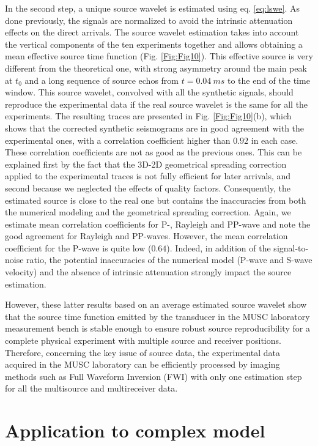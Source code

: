 \documentclass[extra,mreferee]{gji}
\begin{document}
In the second step, a unique source wavelet is estimated using eq. \ref{eq:lswe}. As done previously, the signals are normalized to avoid the intrinsic attenuation effects on the direct arrivals. The source wavelet estimation takes into account the vertical components of the ten experiments together and allows obtaining a mean effective source time function (Fig. \ref{Fig:Fig10}). This effective source is very different from the theoretical one, with strong asymmetry around the main peak at $t_{0}$ and a long sequence of source echos from $t=0.04\ ms$ to the end of the time window. This source wavelet, convolved with all the synthetic signals, should reproduce the experimental data if the real source wavelet is the same for all the experiments. The resulting traces are presented in Fig. \ref{Fig:Fig10}(b), which shows that the corrected synthetic seismograms are in good agreement with the experimental ones, with a correlation coefficient higher than $0.92$ in each case. These correlation coefficients are not as good as the previous ones. This can be explained first by the fact that the 3D-2D geometrical spreading correction applied to the experimental traces is not fully efficient for later arrivals, and second because we neglected the effects of quality factors. Consequently, the estimated source is close to the real one but contains the inaccuracies from both the numerical modeling and the geometrical spreading correction. Again, we estimate mean correlation coefficients for P-, Rayleigh and PP-wave and note the good agreement for Rayleigh and PP-waves. However, the mean correlation coefficient for the P-wave is quite low ($0.64$). Indeed, in addition of the signal-to-noise ratio, the potential inaccuracies of the numerical model (P-wave and S-wave velocity) and the absence of intrinsic attenuation strongly impact the source estimation.

However, these latter results based on an average estimated source wavelet show that the source time function emitted by the transducer in the MUSC laboratory measurement bench is stable enough to ensure robust source reproducibility for a complete physical experiment with multiple source and receiver positions. Therefore, concerning the key issue of source data, the experimental data acquired in the MUSC laboratory can be efficiently processed by imaging methods such as Full Waveform Inversion (FWI) with only one estimation step for all the multisource and multireceiver data.

\section{Application to complex model}
\end{document}
